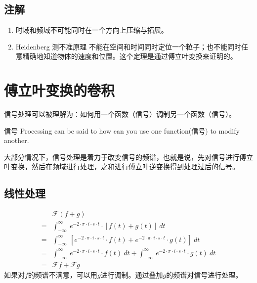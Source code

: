 \subsection{注解}
\begin{enumerate}
	\item 时域和频域不可能同时在一个方向上压缩与拓展。
	\item Heidenberg 测不准原理
	      不能在空间和时间同时定位一个粒子；也不能同时任意精确地知道物体的速度和位置。这个定理是通过傅立叶变换来证明的。
\end{enumerate}
\section{傅立叶变换的卷积}
信号处理可以被理解为：如何用一个函数（信号）调制另一个函数（信号）。

信号 Processing can be said to how can you use one function(信号) to modify another.

大部分情况下，信号处理是着力于改变信号的频谱，也就是说，先对信号进行傅立叶变换，然后在频域进行处理，之和进行傅立叶逆变换得到处理过后的信号。
\subsection{线性处理}
\begin{align*}
	  & \mathcal{F}(f+g)                                                                                                                                        \\
	= & \int_{-\infty}^{\infty}\ e^{-2\cdot \pi\cdot i\cdot s\cdot t}\cdot [f(t)+g(t)]\ dt                                                                      \\
	= & \int_{-\infty}^{\infty}\ [e^{-2\cdot \pi\cdot i\cdot s\cdot t}\cdot f(t)+e^{-2\cdot \pi\cdot i\cdot s\cdot t}\cdot g(t)]\ dt                            \\
	= & \int_{-\infty}^{\infty}\ e^{-2\cdot \pi\cdot i\cdot s\cdot t}\cdot f(t)\ dt+\int_{-\infty}^{\infty}\ e^{-2\cdot \pi\cdot i\cdot s\cdot t}\cdot g(t)\ dt \\
	= & \mathcal{F}f+\mathcal{F}g
\end{align*}
如果对$f$的频谱不满意，可以用$g$进行调制。通过叠加$g$的频谱对信号进行处理。
